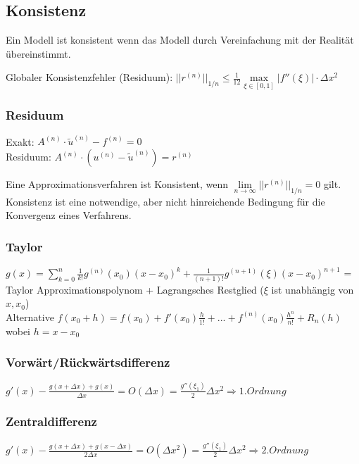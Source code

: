 \subsection{Konsistenz}
Ein Modell ist konsistent wenn das Modell durch Vereinfachung mit der Realität übereinstimmt.

Globaler Konsistenzfehler (Residuum): $\boxed{||r^{(n)}||_{1/n}\leq \frac 1{12}\max\limits_{\xi\in[0,1]}|f''(\xi)|\cdot \Delta x^2}$

\subsubsection{Residuum}
Exakt: $A^{(n)}\cdot \tilde{u}^{(n)}-f^{(n)}=0$\\
Residuum: $A^{(n)}\cdot (u^{(n)}-\tilde{u}^{(n)})=r^{(n)}$

Eine Approximationsverfahren ist Konsistent, wenn $\boxed{\lim\limits_{n\rightarrow \infty}||r^{(n)}||_{1/n}=0}$ gilt.\\

Konsistenz ist eine notwendige, aber nicht hinreichende Bedingung für die Konvergenz eines Verfahrens.

\subsubsection{Taylor}
$g(x)= \sum\limits_{k=0}^n\frac{1}{k!} g^{(n)}(x_0)(x-x_0)^k +
\frac{1}{(n+1)!}g^{(n+1)}(\xi)(x-x_0)^{n+1}$ = Taylor
Approximationspolynom  + Lagrangsches Restglied ($\xi$ ist unabhängig von $x,x_0$)\\

Alternative
$ f(x_0+h)=f(x_0)+f'(x_0)\frac{h}{1!}+...+f^{(n)}(x_0)\frac{h^n}{n!}+R_n(h) $ wobei $ h = x - x_0 $




\subsubsection{Vorwärt/Rückwärtsdifferenz}
$g'(x) - \frac{g(x+\Delta x) + g(x)}{\Delta x}= O(\Delta x) = 
\frac{g''(\xi_1)}{2}\Delta x^2 \Rightarrow 1.Ordnung$


\subsubsection{Zentraldifferenz}
$g'(x) - \frac{g(x+\Delta x) + g(x-\Delta x)}{2\Delta x}= O(\Delta x^2) = 
\frac{g''(\xi_1)}{2}\Delta x^2 \Rightarrow 2.Ordnung$ 



